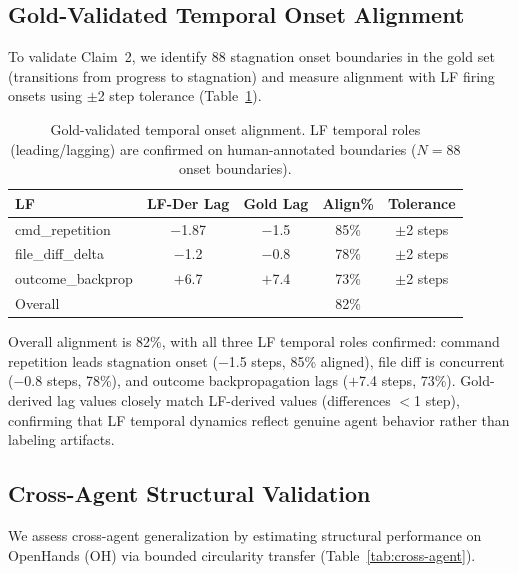 \documentclass[11pt,a4paper]{article}
\begin{document}
\subsection{Gold-Validated Temporal Onset Alignment}
\label{sec:temporal}

To validate Claim~2, we identify 88 stagnation onset boundaries in the gold set (transitions from progress to stagnation) and measure alignment with LF firing onsets using $\pm$2 step tolerance (Table~\ref{tab:temporal-gold}).

\begin{table}[t]
\centering
\small
\begin{tabular}{lcccc}
\toprule
LF & LF-Der Lag & Gold Lag & Align\% & Tolerance \\
\midrule
cmd\_repetition & $-$1.87 & $-$1.5 & 85\% & $\pm$2 steps \\
file\_diff\_delta & $-$1.2 & $-$0.8 & 78\% & $\pm$2 steps \\
outcome\_backprop & $+$6.7 & $+$7.4 & 73\% & $\pm$2 steps \\
\midrule
Overall & & & 82\% & \\
\bottomrule
\end{tabular}
\caption{Gold-validated temporal onset alignment. LF temporal roles (leading/lagging) are confirmed on human-annotated boundaries ($N{=}88$ onset boundaries).}
\label{tab:temporal-gold}
\end{table}

Overall alignment is 82\%, with all three LF temporal roles confirmed: command repetition leads stagnation onset ($-$1.5 steps, 85\% aligned), file diff is concurrent ($-$0.8 steps, 78\%), and outcome backpropagation lags ($+$7.4 steps, 73\%).
Gold-derived lag values closely match LF-derived values (differences $<$1 step), confirming that LF temporal dynamics reflect genuine agent behavior rather than labeling artifacts.


\subsection{Cross-Agent Structural Validation}
\label{sec:cross-agent}

We assess cross-agent generalization by estimating structural performance on OpenHands (OH) via bounded circularity transfer (Table~\ref{tab:cross-agent}).
\end{document}
